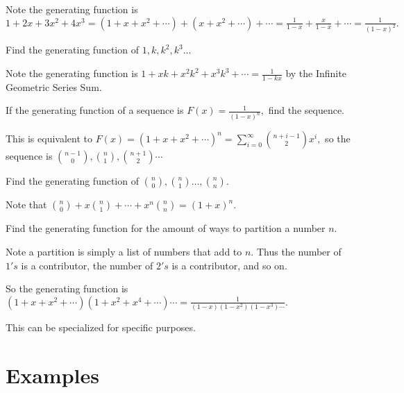 \documentclass{article}
\begin{document}
\begin{sol}
Note the generating function is $1+2x+3x^2+4x^3=(1+x+x^2+\cdots)+(x+x^2+\cdots)+\cdots=\frac{1}{1-x}+\frac{x}{1-x}+\cdots=\frac{1}{(1-x)^2}.$
\end{sol}

\begin{exam}
Find the generating function of $1,k,k^2,k^3\dots$
\end{exam}

\begin{sol}
Note the generating function is $1+xk+x^2k^2+x^3k^3+\cdots=\frac{1}{1-kx}$ by the Infinite Geometric Series Sum.
\end{sol}

\begin{exam}
If the generating function of a sequence is $F(x)=\frac{1}{(1-x)^n},$ find the sequence.
\end{exam}

\begin{sol}
This is equivalent to $F(x)=(1+x+x^2+\cdots)^n=\sum\limits_{i=0}^{\infty}\binom{n+i-1}{2}x^i,$
so the sequence is $\binom{n-1}{0},\binom{n}{1},\binom{n+1}{2}\cdots$
\end{sol}

\begin{exam}
Find the generating function of $\binom{n}{0},\binom{n}{1}\dots,\binom{n}{n}.$
\end{exam}

\begin{sol}
Note that $\binom{n}{0}+x\binom{n}{1}+\cdots+x^n\binom{n}{n}=(1+x)^n.$
\end{sol}

\begin{exam}[Partitions]
Find the generating function for the amount of ways to partition a number $n.$
\end{exam}

\begin{sol}
Note a partition is simply a list of numbers that add to $n.$ Thus the number of $1's$ is a contributor, the number of $2's$ is a contributor, and so on.

So the generating function is $(1+x+x^2+\cdots)(1+x^2+x^4+\cdots)\cdots=\frac{1}{(1-x)(1-x^2)(1-x^3)\cdots}.$
\end{sol}

This can be specialized for specific purposes.

\section{Examples}
\end{document}

